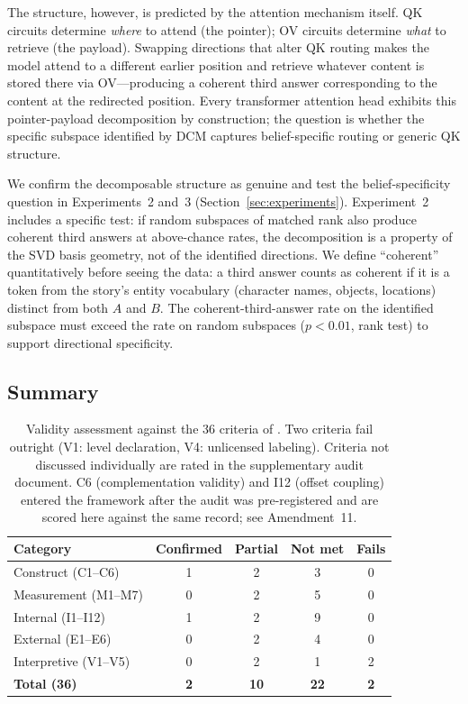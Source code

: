 \documentclass{article}
\begin{document}
The structure, however, is predicted by the attention mechanism itself. QK circuits determine \emph{where} to attend (the pointer); OV circuits determine \emph{what} to retrieve (the payload). Swapping directions that alter QK routing makes the model attend to a different earlier position and retrieve whatever content is stored there via OV---producing a coherent third answer corresponding to the content at the redirected position. Every transformer attention head exhibits this pointer-payload decomposition by construction; the question is whether the specific subspace identified by DCM captures belief-specific routing or generic QK structure.

We confirm the decomposable structure as genuine and test the belief-specificity question in Experiments~2 and~3 (Section~\ref{sec:experiments}). Experiment~2 includes a specific test: if random subspaces of matched rank also produce coherent third answers at above-chance rates, the decomposition is a property of the SVD basis geometry, not of the identified directions. We define ``coherent'' quantitatively before seeing the data: a third answer counts as coherent if it is a token from the story's entity vocabulary (character names, objects, locations) distinct from both $A$ and $B$. The coherent-third-answer rate on the identified subspace must exceed the rate on random subspaces ($p < 0.01$, rank test) to support directional specificity.

\subsection{Summary}

\begin{table}[t]
\centering
\caption{Validity assessment against the 36 criteria of \citet{tower2026mechval}. Two criteria fail outright (V1: level declaration, V4: unlicensed labeling). Criteria not discussed individually are rated in the supplementary audit document. C6 (complementation validity) and I12 (offset coupling) entered the framework after the audit was pre-registered and are scored here against the same record; see Amendment~11.}
\label{tab:validity}
\begin{tabular}{lcccc}
\toprule
Category & Confirmed & Partial & Not met & Fails \\
\midrule
Construct (C1--C6) & 1 & 2 & 3 & 0 \\
Measurement (M1--M7) & 0 & 2 & 5 & 0 \\
Internal (I1--I12) & 1 & 2 & 9 & 0 \\
External (E1--E6) & 0 & 2 & 4 & 0 \\
Interpretive (V1--V5) & 0 & 2 & 1 & 2 \\
\midrule
\textbf{Total (36)} & \textbf{2} & \textbf{10} & \textbf{22} & \textbf{2} \\
\bottomrule
\end{tabular}
\end{table}
\end{document}
